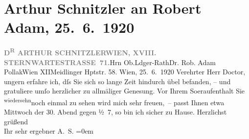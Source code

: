 

               \section[Arthur Schnitzler an Robert Adam, 25. 6. 1920]{ Arthur Schnitzler an Robert Adam, 25. 6. 1920}\nopagebreak{}\rehead{ }\begin{ledgroupsized}[t]{13cm}\normalsize\beginnumbering{} \toendnotes[C]{\smallbreak\pagebreak[2]} 
\pstart{}{\pb}\textcolor{gray}{\textbf{D\textsuperscript{R} ARTHUR SCHNITZLER}}\pend{}\pstart{}\textcolor{gray}{\textbf{WIEN, XVIII. STERNWARTESTRASSE 71.}}\pend{}{\bigskip}\pstart{}Hrn Ob.Ldger-Rath\pend{}\pstart{}Dr. Rob. Adam Pollak\pend{}\pstart{}Wien XII\pend{}\pstart{}Meidlinger Hptstr. 58.\pend{}{\bigskip}\pstart
           \raggedleft{}{\pb}Wien, 25. 6. 1920\pend
           \pstart{}Verehrter Herr Doctor,\pend\pstart
           ungern erfahre ich, dſs Sie sich so lange Zeit hindurch übel befanden, – und
                    gratuliere umſo herzlicher zu allmäliger Genesung. Vor Ihrem So{\geminationm}eraufenthalt Sie \substVorne{}\textsuperscript{wiedersehn}{\allowbreak}\substDazwischen{}noch einmal\substHinten{} zu sehen wird mich sehr freuen, – passt Ihnen etwa Mittwoch der
                        30.{ }Abend gegen ½ 7, so bin ich sicher zu Hause.\pend
           \pstart
           Herzlichst grüßend{\\[\baselineskip]}Ihr sehr ergebner \spacefill\mbox{A. S.}\pend
           \leftskip=0em{}          \endnumbering{}\end{ledgroupsized}  \newcommand{\dateiname}{L02344}\newcommand{\titel}{Arthur Schnitzler an Robert Adam, 25. 6. 1920}\newcommand{\editorInnen}{Martin Anton Müller und Gerd-Hermann Susen}
      